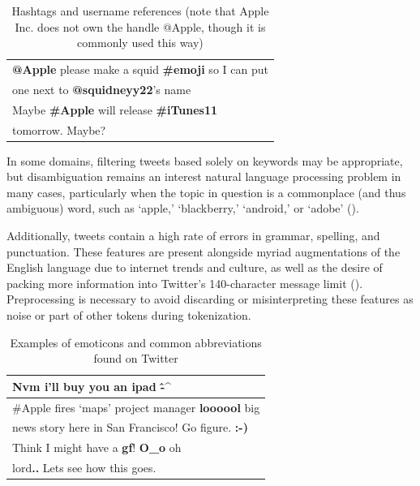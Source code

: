 \documentclass[letterpaper]{article}
\begin{document}
\begin{table}[h]
\centering
\begin{tabular}{|l|}
	\hline
\textbf{@Apple} please make a squid \textbf{\#emoji} so I can put \\
one next to \textbf{@squidneyy22}'s name\\ \hline
Maybe \textbf{\#Apple} will release \textbf{\#iTunes11} \\
tomorrow. Maybe? \\ \hline
\end{tabular}
\caption{Hashtags and username references (note that Apple Inc. does not own the handle @Apple, though it is commonly used this way)}
\label{tab:hashtag_username}
\end{table}

In some domains, filtering tweets based solely on keywords may be appropriate, but disambiguation remains an interest natural language processing problem in many cases, particularly when the topic in question is a commonplace (and thus ambiguous) word, such as `apple,' `blackberry,' `android,' or `adobe' (\citeauthor{journals/ijcsa/YervaMA12}). 

Additionally, tweets contain a high rate of errors in grammar, spelling, and punctuation. These features are present alongside myriad augmentations of the English language due to internet trends and culture, as well as the desire of packing more information into Twitter's 140-character message limit (\citeauthor{Laboreiro:2010:TMM:1871840.1871853}). Preprocessing is necessary to avoid discarding or misinterpreting these features as noise or part of other tokens during tokenization.

\begin{table}[h]
\centering
\begin{tabular}{|l|}
	\hline
\textbf{Nvm} i'll buy you an ipad \textbf{\^-\^} \\ \hline
\#Apple fires `maps' project manager \textbf{loooool} big \\
 news story here in San Francisco! Go figure. \textbf{:-)} \\ \hline
Think I might have a \textbf{gf}! \textbf{O\_o} oh \\
lord\textbf{..} Lets see how this goes. \\ \hline
\end{tabular}
\caption{Examples of emoticons and common abbreviations found on Twitter}
\label{tab:emoticons}
\end{table}
\end{document}
